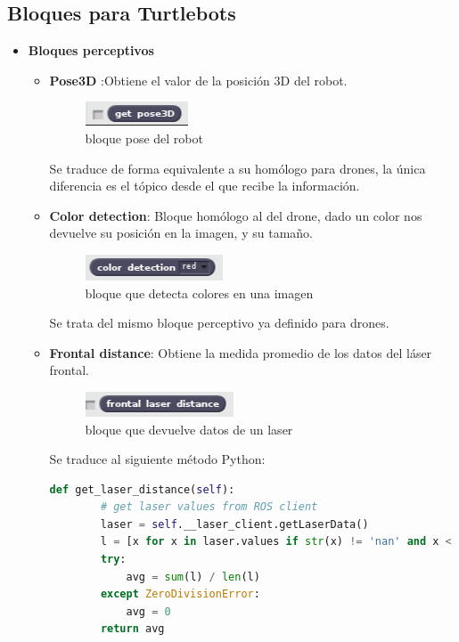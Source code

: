 \subsection{Bloques para Turtlebots}
\begin{itemize}
\item \textbf{Bloques perceptivos}
	\begin{itemize}
	\item \textbf{Pose3D} :Obtiene el valor de la posición 3D del robot.
		\begin{figure}[H]
     		\centering
     		\includegraphics[scale=1.2]{img/block-pose.png}
     		\caption{bloque pose del robot}
  		\label{fig:listas}
  	\end{figure}
Se traduce de forma equivalente a su homólogo para drones, la única diferencia es el tópico desde el que recibe la información.\\
 
	\item \textbf{Color detection}: Bloque homólogo al del drone, dado un color nos devuelve su posición en la imagen, y su tamaño.
		\begin{figure}[H]
     		\centering
     		\includegraphics[scale=1.2]{img/block-color.png}
     		\caption{bloque que detecta colores en una imagen}
  		\label{fig:listas}
  	\end{figure}
Se trata del mismo bloque perceptivo ya definido para drones.\\

\item \textbf{Frontal distance}: Obtiene la medida promedio de los datos del láser frontal. 
		\begin{figure}[H]
     		\centering
     		\includegraphics[scale=1.2]{img/block-laser.png}
     		\caption{bloque que devuelve datos de un laser}
  		\label{fig:listas}
  	\end{figure}
Se traduce al siguiente método Python:\\

\begin{lstlisting}[language=python,firstnumber=1]
def get_laser_distance(self):
        # get laser values from ROS client
        laser = self.__laser_client.getLaserData()
        l = [x for x in laser.values if str(x) != 'nan' and x < 10]
        try:
            avg = sum(l) / len(l)
        except ZeroDivisionError:
            avg = 0
        return avg
\end{lstlisting}


\end{itemize}
\end{itemize}
